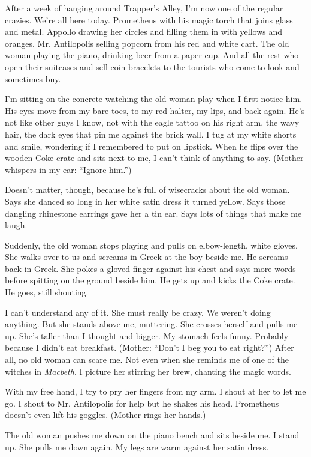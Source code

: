 \documentclass[twoside,10pt]{book}
\begin{document}
After a week of hanging around Trapper's Alley, I'm now one of the
regular crazies. We're all here today. Prometheus with his magic torch
that joins glass and metal. Appollo drawing her circles and filling them
in with yellows and oranges. Mr. Antilopolis selling popcorn from his
red and white cart. The old woman playing the piano, drinking beer from
a paper cup. And all the rest who open their suitcases and sell coin
bracelets to the tourists who come to look and sometimes buy.

I'm sitting on the concrete watching the old woman play when I first
notice him. His eyes move from my bare toes, to my red halter, my lips,
and back again. He's not like other guys I know, not with the eagle
tattoo on his right arm, the wavy hair, the dark eyes that pin me
against the brick wall. I tug at my white shorts and smile, wondering if
I remembered to put on lipstick. When he flips over the wooden Coke
crate and sits next to me, I can't think of anything to say. (Mother
whispers in my ear: ``Ignore him.'')

Doesn't matter, though, because he's full of wisecracks about the old
woman. Says she danced so long in her white satin dress it turned
yellow. Says those dangling rhinestone earrings gave her a tin ear. Says
lots of things that make me laugh.

Suddenly, the old woman stops playing and pulls on elbow-length, white
gloves. She walks over to us and screams in Greek at the boy beside me.
He screams back in Greek. She pokes a gloved finger against his chest
and says more words before spitting on the ground beside him. He gets up
and kicks the Coke crate. He goes, still shouting.

I can't understand any of it. She must really be crazy. We weren't doing
anything. But she stands above me, muttering. She crosses herself and
pulls me up. She's taller than I thought and big­ger. My stomach feels
funny. Probably because I didn't eat breakfast. (Mother: ``Don't I beg
you to eat right?'') After all, no old woman can scare me. Not even when
she reminds me of one of the witches in \emph{Macbeth}. I picture her
stirring her brew, chanting the magic words.

With my free hand, I try to pry her fingers from my arm. I shout at her
to let me go. I shout to Mr. Antilopolis for help but he shakes his
head. Prometheus doesn't even lift his goggles. (Mother rings her
hands.)

The old woman pushes me down on the piano bench and sits beside me. I
stand up. She pulls me down again. My legs are warm against her satin
dress.
\end{document}
